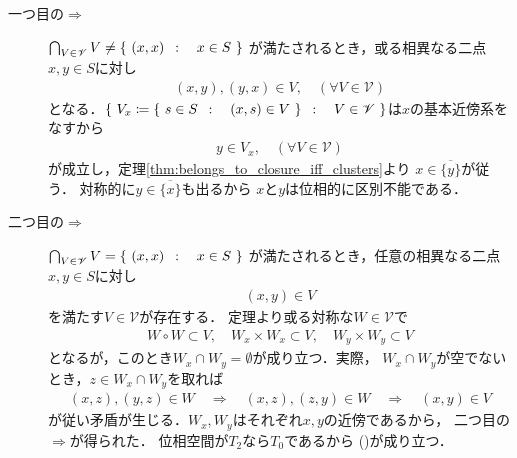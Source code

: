 	\begin{prf}\mbox{}
		\begin{description}
			\item[一つ目の$\Longrightarrow$]
				$\bigcap_{V \in \mathscr{V}}V \neq \left\{\ (x,x)\ \, : \quad x \in S\ \right\}$
				が満たされるとき，或る相異なる二点$x,y \in S$に対し
				\begin{align}
					(x,y),(y,x) \in V, \quad (\forall V \in \mathscr{V})
				\end{align}
				となる．$\left\{\ V_x \coloneqq \left\{\ s \in S\ \, : \quad (x,s) \in V\ \right\}\ \, : \quad V \in \mathscr{V}\ \right\}$は$x$の基本近傍系をなすから
				\begin{align}
					y \in V_x, \quad (\forall V \in \mathscr{V})
				\end{align}
				が成立し，定理\ref{thm:belongs_to_closure_iff_clusters}より
				$x \in \overline{\{y\}}$が従う．
				対称的に$y \in \overline{\{x\}}$も出るから
				$x$と$y$は位相的に区別不能である．
				
			\item[二つ目の$\Longrightarrow$]
				$\bigcap_{V \in \mathscr{V}}V = \left\{\ (x,x)\ \, : \quad x \in S\ \right\}$
				が満たされるとき，任意の相異なる二点$x,y \in S$に対し
				\begin{align}
					(x,y) \in V
				\end{align}
				を満たす$V \in \mathscr{V}$が存在する．
				定理より或る対称な$W \in \mathscr{V}$で
				\begin{align}
					W \circ W \subset V,
					\quad W_x \times W_x \subset V,
					\quad W_y \times W_y \subset V
				\end{align}
				となるが，このとき$W_x \cap W_y = \emptyset$が成り立つ．実際，
				$W_x \cap W_y$が空でないとき，$z \in W_x \cap W_y$を取れば
				\begin{align}
					(x,z),(y,z) \in W \quad \Longrightarrow \quad
					(x,z),(z,y) \in W \quad \Longrightarrow \quad
					(x,y) \in V
				\end{align}
				が従い矛盾が生じる．$W_x,W_y$はそれぞれ$x,y$の近傍であるから，
				二つ目の$\Longrightarrow$が得られた．
				位相空間が$T_2$なら$T_0$であるから
				()が成り立つ．
				\QED
		\end{description}
	\end{prf}